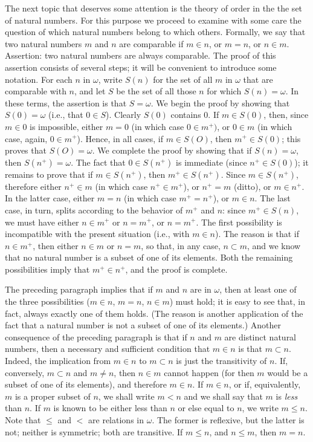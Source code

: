The next topic that deserves some attention is the theory of order in the the set of natural numbers. For this purpose we proceed to examine with some care the question of which natural numbers belong to which others. Formally, we say that two natural numbers $m$ and $n$ are comparable if $m \in n$, or $m = n$, or $n \in m$. Assertion: two natural numbers are always comparable. The proof of this assertion consists of several steps; it will be convenient to introduce some notation. For each $n$ in $\omega$, write $S(n)$ for the set of all $m$ in $\omega$ that are comparable with $n$, and let $S$ be the set of all those $n$ for which $S(n) = \omega$. In these terms, the assertion is that $S = \omega$. We begin the proof by showing that $S(0) = \omega$ (i.e., that $0 \in S$). Clearly $S(0)$ contains $0$. If $m \in S(0)$, then, since $m \in 0$ is impossible, either $m = 0$ (in which case $0 \in m^{+})$, or $0 \in m$ (in which case, again, $0 \in m^{+}$). Hence, in all cases, if $m \in S(O)$, then $m^{+} \in S(0)$; this proves that $S(O) = \omega$. We complete the proof by showing that if $S(n) = \omega$, then $S(n^{+}) = \omega$. The fact that $0 \in S(n^{+})$ is immediate (since $n^{+} \in S(0)$); it remains to prove that if $m \in S(n^{+})$, then $m^{+} \in S(n^{+})$. Since $m \in S(n^{+})$, therefore either $n^{+} \in m$ (in which case $n^{+} \in m^{+}$), or $n^{+} = m$ (ditto), or $m \in n^{+}$. In the latter case, either $m = n$ (in which case $m^{+} = n^{+}$), or $m \in n$. The last case, in turn, splits according to the behavior of $m^{+}$ and $n$: since $m^{+} \in S(n)$, we must have either $n \in m^{+}$ or $n = m^{+}$, or $n = m^{+}$. The first possibility is incompatible with the present situation (i.e., with $m \in n$). The reason is that if $n \in m^{+}$, then either $n \in m$ or $n = m$, so that, in any case, $n \subset m$, and we know that no natural number is a subset of one of its elements. Both the remaining possibilities imply that $m^{+} \in n^{+}$, and the proof is complete. 

The preceding paragraph implies that if $m$ and $n$ are in $\omega$, then at least one of the three possibilities ($m \in n$, $m = n$, $n \in m$) must hold; it is easy to see that, in fact, always exactly one of them holds. (The reason is another application of the fact that a natural number is not a subset of one of its elements.) Another consequence of the preceding paragraph is that if $n$ and $m$ are distinct natural numbers, then a necessary and sufficient condition that $m \in n$ is that $m \subset n$. Indeed, the implication from $m \in n$ to $m \subset n$ is just the transitivity of $n$. If, conversely, $m \subset n$ and $m \neq n$, then $n \in m$ cannot happen (for then $m$ would be a subset of one of its elements), and therefore $m \in n$. If $m \in n$, or if, equivalently, $m$ is a proper subset of $n$, we shall write $m < n$ and we shall say that $m$ is \textit{less} than $n$. If $m$ is known to be either less than $n$ or else equal to $n$, we write $m \le n$. Note that $\le$ and $<$ are relations in $\omega$. The former is reflexive, but the latter is not; neither is symmetric; both are transitive. If $m \le n$, and $n \le m$, then $m = n$.

